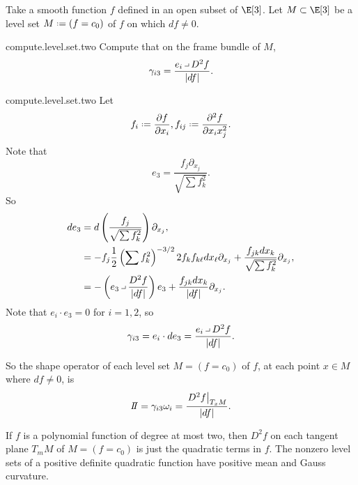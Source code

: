 Take a smooth function \(f\) defined in an open subset of \(\E[3]\).
Let \(M\subset\E[3]\) be a level set \(M\defeq(f=c_0)\) of \(f\) on which \(df\ne 0\).
\begin{problem}{compute.level.set.two}
Compute that on the frame bundle of \(M\),
\[
\gamma_{i3}=\frac{e_i\hook D^2 f}{|df|}.
\]
\end{problem}
\begin{answer}{compute.level.set.two}
Let 
\[
f_i\defeq \pderiv{f}{x_i}, f_{ij}\defeq \pderiv[2]{f}{x_i x_j}.
\]
Note that
\[
e_3=\frac{f_j \partial_{x_j}}{\sqrt{\sum f_k^2}}.
\]
So
\begin{align*}
de_3
&=
d\left(\frac{f_j }{\sqrt{\sum f_k^2}}\right)\partial_{x_j},
\\
&=
-f_j \frac{1}{2}\left(\sum f_k^2\right)^{-3/2} 2 f_k f_{k\ell} dx_{\ell} \partial_{x_j}
+
\frac{f_{jk}dx_k}{\sqrt{\sum f_k^2}}\partial_{x_j},
\\
&=
-\left(e_3 \hook \frac{D^2 f}{|df|}\right)e_3
+
\frac{f_{jk}dx_k}{|df|}\partial_{x_j}.
\end{align*}
Note that \(e_i\cdot e_3=0\) for \(i=1,2\), so  
\[
\gamma_{i3}=e_i \cdot de_3=\frac{e_i\hook D^2f}{|df|}.
\]
\end{answer}
So the shape operator of each level set \(M=(f=c_0)\) of \(f\), at each point \(x\in M\) where \(df\ne 0\), is
\[
\shapeOp=\gamma_{i3}\omega_i=\frac{\left.D^2 f\right|_{T_x M}}{|df|}.
\]
\begin{example}
If \(f\) is a polynomial function of degree at most two, then \(D^2 f\) on each tangent plane \(T_m M\) of \(M=(f=c_0)\) is just the quadratic terms in \(f\).
The nonzero level sets of a positive definite quadratic function have positive mean and Gauss curvature.
\end{example}